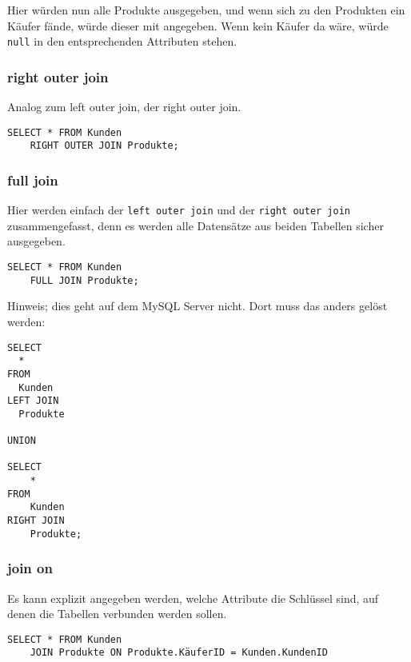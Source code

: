 Hier würden nun alle Produkte ausgegeben, und wenn sich zu den Produkten ein Käufer fände, würde dieser mit angegeben. Wenn kein Käufer da wäre, würde \texttt{null} in den entsprechenden Attributen stehen.


\subsubsection{right outer join}
Analog zum left outer join, der right outer join.

\begin{lstlisting}[caption={Right Join SQL}]
    SELECT * FROM Kunden
    RIGHT OUTER JOIN Produkte;
\end{lstlisting}


\subsubsection{full join}
Hier werden einfach der \texttt{left outer join} und der \texttt{right outer join} zusammengefasst, denn es werden alle Datensätze aus beiden Tabellen sicher ausgegeben.

\begin{lstlisting}[caption={Full Join SQL}]
    SELECT * FROM Kunden
    FULL JOIN Produkte;
\end{lstlisting}

Hinweis; dies geht auf dem MySQL Server nicht. Dort muss das anders gelöst werden:

\begin{lstlisting}[caption={Full Outer Join in MySQL}]
SELECT
  *
FROM
  Kunden
LEFT JOIN
  Produkte
  
UNION

SELECT
    *
FROM
    Kunden
RIGHT JOIN
    Produkte;
\end{lstlisting}


\subsubsection{join on}
Es kann explizit angegeben werden, welche Attribute die Schlüssel sind, auf denen die Tabellen verbunden werden sollen.

\begin{lstlisting}[caption={JOIN ON Beispiel}]
    SELECT * FROM Kunden
    JOIN Produkte ON Produkte.KäuferID = Kunden.KundenID
\end{lstlisting}


